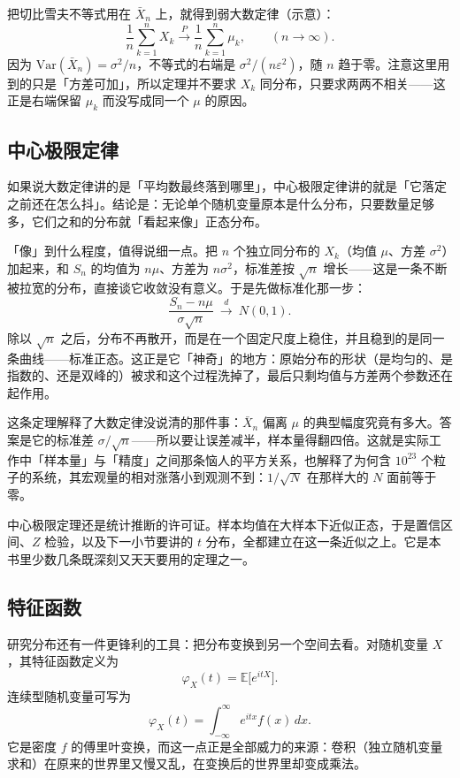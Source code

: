 \documentclass[UTF8]{ctexbook}
\begin{document}
把切比雪夫不等式用在 $\bar X_n$ 上，就得到弱大数定律（示意）：
\[
\frac{1}{n}\sum_{k=1}^n X_k \xrightarrow{P} \frac{1}{n}\sum_{k=1}^n \mu_k,\qquad (n\to\infty).
\]
因为 $\mathrm{Var}(\bar X_n)=\sigma^2/n$，不等式的右端是 $\sigma^2/(n\varepsilon^2)$，随 $n$ 趋于零。注意这里用到的只是「方差可加」，所以定理并不要求 $X_k$ 同分布，只要求两两不相关——这正是右端保留 $\mu_k$ 而没写成同一个 $\mu$ 的原因。

\subsection{中心极限定律}

如果说大数定律讲的是「平均数最终落到哪里」，中心极限定律讲的就是「它落定之前还在怎么抖」。结论是：无论单个随机变量原本是什么分布，只要数量足够多，它们之和的分布就「看起来像」正态分布。

「像」到什么程度，值得说细一点。把 $n$ 个独立同分布的 $X_k$（均值 $\mu$、方差 $\sigma^2$）加起来，和 $S_n$ 的均值为 $n\mu$、方差为 $n\sigma^2$，标准差按 $\sqrt n$ 增长——这是一条不断被拉宽的分布，直接谈它收敛没有意义。于是先做标准化那一步：
\[
\frac{S_n-n\mu}{\sigma\sqrt n}\ \xrightarrow{\ d\ }\ N(0,1).
\]
除以 $\sqrt n$ 之后，分布不再散开，而是在一个固定尺度上稳住，并且稳到的是同一条曲线——标准正态。这正是它「神奇」的地方：原始分布的形状（是均匀的、是指数的、还是双峰的）被求和这个过程洗掉了，最后只剩均值与方差两个参数还在起作用。

这条定理解释了大数定律没说清的那件事：$\bar X_n$ 偏离 $\mu$ 的典型幅度究竟有多大。答案是它的标准差 $\sigma/\sqrt n$——所以要让误差减半，样本量得翻四倍。这就是实际工作中「样本量」与「精度」之间那条恼人的平方关系，也解释了为何含 $10^{23}$ 个粒子的系统，其宏观量的相对涨落小到观测不到：$1/\sqrt N$ 在那样大的 $N$ 面前等于零。

中心极限定理还是统计推断的许可证。样本均值在大样本下近似正态，于是置信区间、$Z$ 检验，以及下一小节要讲的 $t$ 分布，全都建立在这一条近似之上。它是本书里少数几条既深刻又天天要用的定理之一。

\subsection{特征函数}

研究分布还有一件更锋利的工具：把分布变换到另一个空间去看。对随机变量 $X$，其特征函数定义为
\[
\varphi_X(t)=\mathbb{E}\bigl[e^{itX}\bigr].
\]
连续型随机变量可写为
\[
\varphi_X(t)=\int_{-\infty}^{\infty} e^{itx}f(x)\,dx.
\]
它是密度 $f$ 的傅里叶变换，而这一点正是全部威力的来源：卷积（独立随机变量求和）在原来的世界里又慢又乱，在变换后的世界里却变成乘法。
\end{document}
